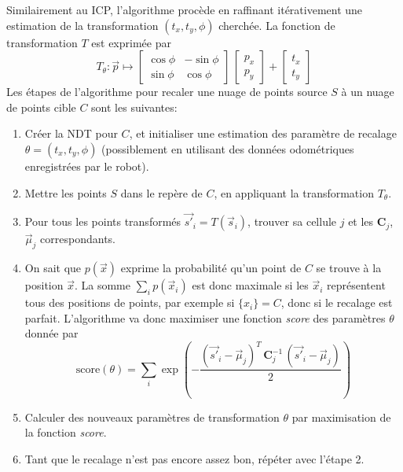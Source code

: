 \documentclass[a4paper,10pt]{scrreprt}
\begin{document}
Similairement au ICP, l'algorithme procède en raffinant itérativement une estimation de la transformation $(t_x, t_y, \phi)$ cherchée. La fonction de transformation $T$ est exprimée par
\begin{equation*}
	T_{\theta} : \vec{p} \mapsto \begin{bmatrix}
		\cos \phi & - \sin \phi \\
		\sin \phi & \cos \phi
	\end{bmatrix} \, \begin{bmatrix}
		p_x \\
		p_y
	\end{bmatrix} + \begin{bmatrix}
		t_x \\
		t_y
	\end{bmatrix}
\end{equation*}
Les étapes de l'algorithme pour recaler une nuage de points source $S$ à un nuage de points cible $C$ sont les suivantes:
\begin{enumerate}
	\item Créer la NDT pour $C$, et initialiser une estimation des paramètre de recalage $\theta = (t_x, t_y, \phi)$ (possiblement en utilisant des données odométriques enregistrées par le robot).
	\item Mettre les points $S$ dans le repère de $C$, en appliquant la transformation $T_{\theta}$.
	\item Pour tous les points transformés $\vec{s'}_i = T(\vec{s}_i)$, trouver sa cellule $j$ et les $\mathbf{C}_j$, $\vec{\mu}_j$ correspondants.
	\item On sait que $p(\vec{x})$ exprime la probabilité qu'un point de $C$ se trouve à la position $\vec{x}$. La somme $\sum_i p(\vec{x}_i)$ est donc maximale si les $\vec{x}_i$ représentent tous des positions de points, par exemple si $\{ x_i \} = C$, donc si le recalage est parfait. L'algorithme va donc maximiser une fonction \emph{score} des paramètres $\theta$ donnée par
		\begin{equation*}
			\text{score}(\theta) = \sum_{i} \exp \left( - \frac{ (\vec{s'}_i - \vec{\mu}_j)^T \, \mathbf{C}_j^{-1} \, (\vec{s'}_i - \vec{\mu}_j) }{2} \right)
		\end{equation*}
	\item Calculer des nouveaux paramètres de transformation $\theta$ par maximisation de la fonction \emph{score}.
	\item Tant que le recalage n'est pas encore assez bon, répéter avec l'étape 2.
\end{enumerate}
\end{document}
